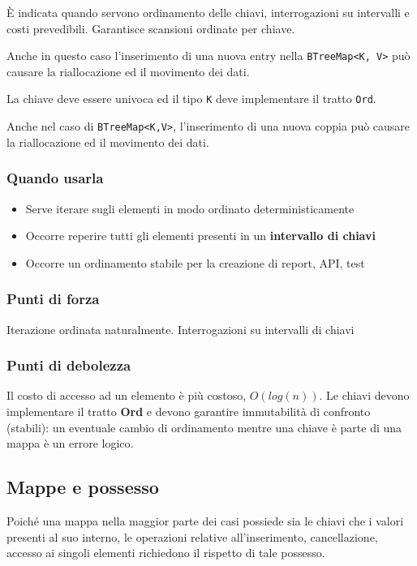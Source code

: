 È indicata quando servono ordinamento delle chiavi, interrogazioni su intervalli
e costi prevedibili. Garantisce scansioni ordinate per chiave.

Anche in questo caso l'inserimento di una nuova entry nella \texttt{BTreeMap<K,
  V>} può causare la riallocazione ed il movimento dei dati.

La chiave deve essere univoca ed il tipo \texttt{K} deve implementare il tratto
\texttt{Ord}.

Anche nel caso di \texttt{BTreeMap<K,V>}, l'inserimento di una nuova coppia può
causare la riallocazione ed il movimento dei dati.


\subsubsection{Quando usarla}


\begin{itemize}
  \item Serve iterare sugli elementi in modo ordinato deterministicamente
  \item Occorre reperire tutti gli elementi presenti in un \textbf{intervallo di chiavi}
  \item Occorre un ordinamento stabile per la creazione di report, API, test
\end{itemize}

\subsubsection{Punti di forza}

Iterazione ordinata naturalmente. Interrogazioni su intervalli di chiavi

\subsubsection{Punti di debolezza}

Il costo di accesso ad un elemento è più costoso, $O(log(n))$. Le chiavi devono
implementare il tratto \textbf{Ord} e devono garantire immutabilità di confronto
(stabili): un eventuale cambio di ordinamento mentre una chiave è parte di una
mappa è un errore logico.

\subsection{Mappe e possesso}
Poiché una mappa nella maggior parte dei casi possiede sia le chiavi che i
valori presenti al suo interno, le operazioni relative all'inserimento,
cancellazione, accesso ai singoli elementi richiedono il rispetto di tale
possesso.

